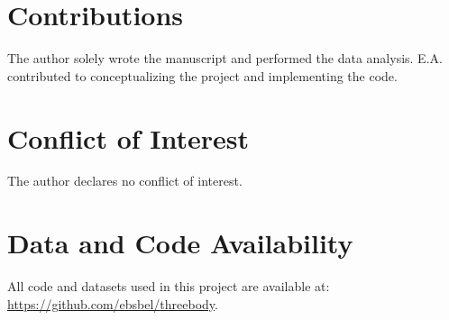 \documentclass[%
 reprint,
 amsmath,amssymb,
 aps,
]{revtex4-2}
\begin{document}
\section{\label{sec:Contribution}Contributions} %

The author solely wrote the manuscript and performed the data analysis. E.A. contributed to conceptualizing the project and implementing the code.




\section{\label{sec:COI}Conflict of Interest} %

The author declares no conflict of interest.





\section{\label{sec:datacode}Data and Code Availability} %

All code and datasets used in this project are available at: \href{https://github.com/ebsbel/threebody}{https://github.com/ebsbel/threebody}.










\end{document}
